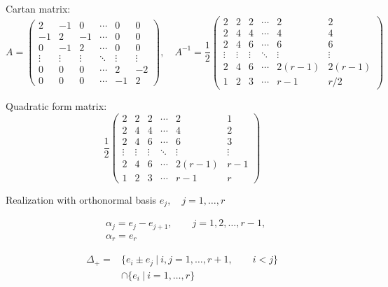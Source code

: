 \documentclass[12pt]{article}
\begin{document}
Cartan matrix:
\[
A=\left(
\begin{array}{cccccc}
 2 & -1& 0 &\cdots & 0 & 0 \\
 -1& 2 & -1 &\cdots & 0 & 0 \\
 0 & -1 & 2 &\cdots & 0 & 0 \\
  \vdots&\vdots &\vdots &\ddots &\vdots &\vdots \\
 0&0 &0 &\cdots & 2& -2\\
 0&0 &0 &\cdots & -1& 2
\end{array}
\right),\quad
A^{-1}=\frac{1}{2}
\left(
\begin{array}{cccccc}
 2& 2& 2 &\cdots & 2 & 2 \\
 2& 4 & 4 &\cdots & 4 & 4 \\
 2& 4 & 6 &\cdots & 6 & 6 \\
  \vdots&\vdots &\vdots &\ddots &\vdots &\vdots \\
 2&4 &6 &\cdots & 2(r-1)& 2(r-1)\\
 1&2 &3 &\cdots & r-1& r/2
\end{array}
\right)
\]

Quadratic form matrix:
\[\frac{1}{2}
\left(
\begin{array}{cccccc}
 2& 2& 2 &\cdots & 2 & 1 \\
 2& 4 & 4 &\cdots & 4 & 2 \\
 2& 4 & 6 &\cdots & 6 & 3 \\
  \vdots&\vdots &\vdots &\ddots &\vdots &\vdots \\
 2&4 &6 &\cdots & 2(r-1)& r-1\\
 1&2 &3 &\cdots & r-1& r
\end{array}
\right)
\]

Realization with orthonormal basis $e_j,\quad j=1,\dots,r$

\begin{align*}
  &\alpha_{j}=e_j-e_{j+1},\qquad j=1,2,\dots,r-1,\\
  &\alpha_{r}=e_r
\end{align*}

\begin{align*}
 \Delta_{+}=&\{e_i \pm e_j\ |\ i,j=1,\dots,r+1,\qquad i<j\} \\
      &\cap
       \{e_{i}\ |\ i=1,\dots,r\}
\end{align*}

%
\end{document}

